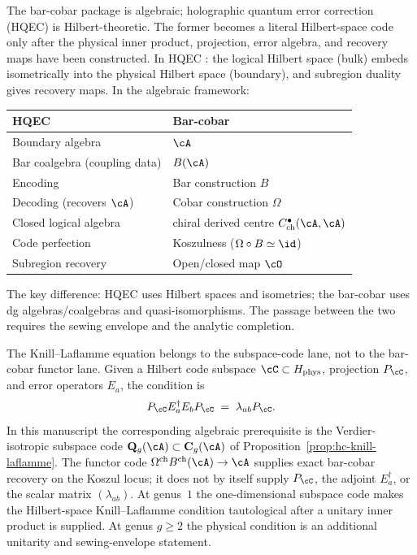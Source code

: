 \begin{remark}
\label{rem:thqg-hqec-analogy}
The bar-cobar package is algebraic; holographic quantum error
correction (HQEC) is Hilbert-theoretic.  The former becomes a literal
Hilbert-space code only after the physical inner product, projection,
error algebra, and recovery maps have been constructed.  In HQEC
\cite{Almheiri-Dong-Harlow15}:
the logical Hilbert space (bulk) embeds isometrically into the
physical Hilbert space (boundary), and subregion duality gives
recovery maps. In the algebraic framework:
\begin{center}
\renewcommand{\arraystretch}{1.2}
\small
\begin{tabular}{ll}
\textbf{HQEC} & \textbf{Bar-cobar} \\
\midrule
Boundary algebra & $\cA$ \\
Bar coalgebra (coupling data) & $B(\cA)$ \\
Encoding & Bar construction $B$ \\
Decoding (recovers $\cA$) & Cobar construction $\Omega$ \\
Closed logical algebra & chiral derived centre
$C^\bullet_{\mathrm{ch}}(\cA,\cA)$ \\
Code perfection & Koszulness ($\Omega \circ B \simeq \id$) \\
Subregion recovery & Open/closed map $\cO$
\end{tabular}
\end{center}
The key difference: HQEC uses Hilbert spaces and isometries;
the bar-cobar uses dg algebras/coalgebras and quasi-isomorphisms.
The passage between the two requires the sewing envelope
and the analytic completion.
\end{remark}

\begin{remark}
\label{rem:thqg-knill-laflamme-boundary}
The Knill--Laflamme equation belongs to the subspace-code lane, not
to the bar-cobar functor lane.  Given a Hilbert code subspace
$\cC\subset H_{\mathrm{phys}}$, projection $P_\cC$, and error
operators $E_a$, the condition is
\[
P_\cC E_a^\dagger E_b P_\cC
\;=\;
\lambda_{ab}P_\cC .
\]
In this manuscript the corresponding algebraic prerequisite is the
Verdier-isotropic subspace code
$\mathbf Q_g(\cA)\subset \mathbf C_g(\cA)$
of Proposition~\ref{prop:hc-knill-laflamme}.  The functor code
$\Omega^{\mathrm{ch}}B^{\mathrm{ch}}(\cA)\to\cA$ supplies exact
bar-cobar recovery on the Koszul locus; it does not by itself supply
$P_\cC$, the adjoint $E_a^\dagger$, or the scalar matrix
$(\lambda_{ab})$.  At genus~$1$ the one-dimensional subspace code
makes the Hilbert-space Knill--Laflamme condition tautological after a
unitary inner product is supplied.  At genus $g\ge2$ the physical
condition is an additional unitarity and sewing-envelope statement.
\end{remark}


